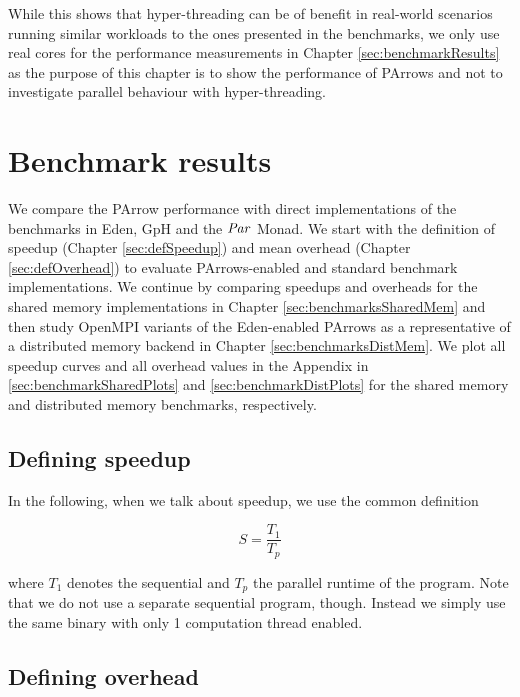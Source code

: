 \documentclass[paper=A4,twoside=true,openright,parskip=full,chapterprefix=true,headings=normal,bibliography=totoc,listof=totoc,titlepage=on,captions=tableabove,draft=false,british]{scrreprt}%
\begin{document}
While this shows that hyper-threading can be of benefit in real-world
scenarios running similar workloads to the ones presented in the
benchmarks, we only use real cores for the performance measurements in
Chapter \ref{sec:benchmarkResults} as the purpose of this chapter is to
show the performance of PArrows and not to investigate parallel
behaviour with hyper-threading.

\hypertarget{benchmark-results}{%
\section{Benchmark results}\label{benchmark-results}}

\label{sec:benchmarkResults}

We compare the PArrow performance with direct implementations of the
benchmarks in Eden, GpH and the \ensuremath{\Conid{Par}} Monad. We start with the
definition of speedup (Chapter \ref{sec:defSpeedup}) and mean overhead
(Chapter \ref{sec:defOverhead}) to evaluate PArrows-enabled and standard
benchmark implementations. We continue by comparing speedups and
overheads for the shared memory implementations in Chapter
\ref{sec:benchmarksSharedMem} and then study OpenMPI variants of the
Eden-enabled PArrows as a representative of a distributed memory backend
in Chapter \ref{sec:benchmarksDistMem}. We plot all speedup curves and
all overhead values in the Appendix in \ref{sec:benchmarkSharedPlots}
and \ref{sec:benchmarkDistPlots} for the shared memory and distributed
memory benchmarks, respectively.

\hypertarget{defining-speedup}{%
\subsection{Defining speedup}\label{defining-speedup}}

\label{sec:defSpeedup}

In the following, when we talk about speedup, we use the common
definition

\[
S = \frac{T_1}{T_p}
\]

where \(T_1\) denotes the sequential and \(T_p\) the parallel runtime of
the program. Note that we do not use a separate sequential program,
though. Instead we simply use the same binary with only 1 computation
thread enabled.

\hypertarget{defining-overhead}{%
\subsection{Defining overhead}\label{defining-overhead}}
\end{document}

